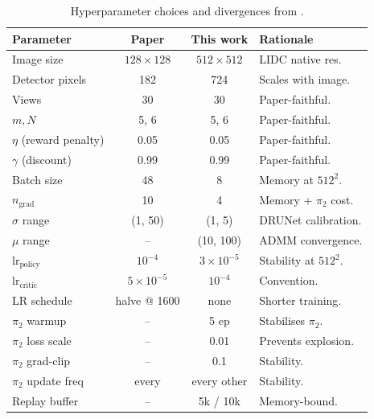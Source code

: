 
\begin{table}[htbp]
    \centering
    \small
    \caption{Hyperparameter choices and divergences from
             \citet{Wei2022TFPnP}.}
    \label{tab:hyperparameters}
    \begin{tabular}{lccl}
        \toprule
        \textbf{Parameter} & \textbf{Paper} & \textbf{This work} & \textbf{Rationale} \\
        \midrule
        Image size              & $128 \times 128$ & $512 \times 512$ & LIDC native res. \\
        Detector pixels         & 182  & 724  & Scales with image. \\
        Views                   & 30   & 30   & Paper-faithful. \\
        $m, N$                  & 5, 6 & 5, 6 & Paper-faithful. \\
        $\eta$ (reward penalty) & 0.05 & 0.05 & Paper-faithful. \\
        $\gamma$ (discount)     & 0.99 & 0.99 & Paper-faithful. \\
        Batch size              & 48   & 8    & Memory at $512^2$. \\
        $n_\text{grad}$         & 10   & 4    & Memory + $\pi_2$ cost. \\
        $\sigma$ range          & (1, 50) & (1, 5) & DRUNet calibration. \\
        $\mu$ range             & --     & (10, 100) & ADMM convergence. \\
        $\text{lr}_\text{policy}$  & $10^{-4}$ & $3\times10^{-5}$ & Stability at $512^2$. \\
        $\text{lr}_\text{critic}$  & $5\times10^{-5}$ & $10^{-4}$ & Convention. \\
        LR schedule             & halve @ 1600 & none & Shorter training. \\
        $\pi_2$ warmup          & --   & 5 ep & Stabilises $\pi_2$. \\
        $\pi_2$ loss scale      & --   & 0.01 & Prevents explosion. \\
        $\pi_2$ grad-clip       & --   & 0.1  & Stability. \\
        $\pi_2$ update freq     & every & every other & Stability. \\
        Replay buffer           & --   & 5k / 10k & Memory-bound. \\
        \bottomrule
    \end{tabular}
\end{table}


